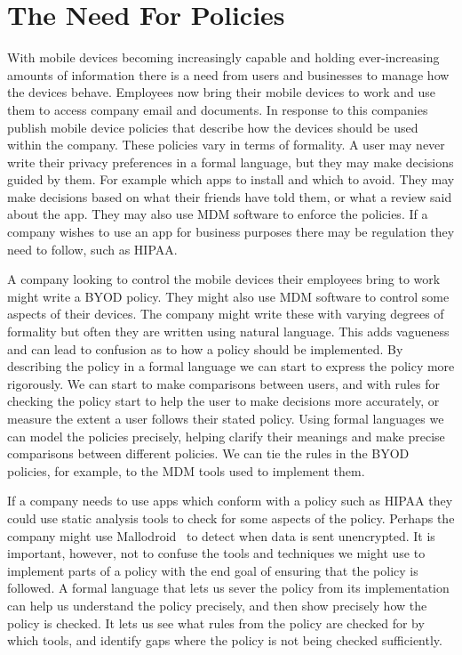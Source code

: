 \documentclass[thesis.tex]{subfiles}
\begin{document}
\section{The Need For Policies}

With mobile devices becoming increasingly capable and holding
ever-increasing amounts of information there is a need from users and
businesses to manage how the devices behave.  Employees now bring
their mobile devices to work and use them to access company email and
documents.  In response to this companies publish mobile device
policies that describe how the devices should be used within the
company.  These policies vary in terms of formality.  A user may never
write their privacy preferences in a formal language, but they may
make decisions guided by them.  For example which apps to install and
which to avoid.  They may make decisions based on what their friends
have told them, or what a review said about the app.  They may also
use \ac{MDM} software to enforce the policies.  If a company wishes to
use an app for business purposes there may be regulation they need to
follow, such as \ac{HIPAA}.

A company looking to control the mobile devices their employees bring
to work might write a \ac{BYOD} policy.  They might also use \ac{MDM}
software to control some aspects of their devices.  The company might
write these with varying degrees of formality but often they are
written using natural language.  This adds vagueness and can lead to
confusion as to how a policy should be implemented.  By describing the
policy in a formal language we can start to express the policy more
rigorously.  We can start to make comparisons between users, and with
rules for checking the policy start to help the user to make decisions
more accurately, or measure the extent a user follows their stated
policy.  Using formal languages we can
model the policies precisely, helping clarify their meanings and make
precise comparisons between different policies.  We can tie the rules
in the \ac{BYOD} policies, for example, to the \ac{MDM} tools used to
implement them.

If a company needs to use apps which conform with a policy such as
\ac{HIPAA} they could use static analysis tools to check for some
aspects of the policy.  Perhaps the company might use
Mallodroid~\cite{fahl_why_2012} to detect when data is sent
unencrypted.  It is important, however, not to confuse the tools and
techniques we might use to implement parts of a policy with the end
goal of ensuring that the policy is followed.  A formal language that
lets us sever the policy from its implementation can help us
understand the policy precisely, and then show precisely how the
policy is checked.  It lets us see what rules from the policy are
checked for by which tools, and identify gaps where the policy is not
being checked sufficiently.
\end{document}
